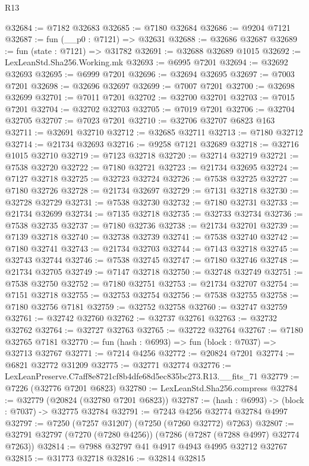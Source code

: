\begin{lexlean}{R13}
\begin{coremodule}
@32684 := @7182 @32683
@32685 := @7180 @32684
@32686 := @9204 @7121
@32687 := fun (__p0 : @7121) => @32631
@32688 := @32686 @32687
@32689 := fun (state : @7121) => @31782
@32691 := @32688 @32689 @1015
@32692 := LexLeanStd.Sha256.Working.mk
@32693 := @6995 @7201
@32694 := @32692 @32693
@32695 := @6999 @7201
@32696 := @32694 @32695
@32697 := @7003 @7201
@32698 := @32696 @32697
@32699 := @7007 @7201
@32700 := @32698 @32699
@32701 := @7011 @7201
@32702 := @32700 @32701
@32703 := @7015 @7201
@32704 := @32702 @32703
@32705 := @7019 @7201
@32706 := @32704 @32705
@32707 := @7023 @7201
@32710 := @32706 @32707 @6823 @163
@32711 := @32691 @32710
@32712 := @32685 @32711
@32713 := @7180 @32712
@32714 := @21734 @32693
@32716 := @9258 @7121 @32689
@32718 := @32716 @1015 @32710
@32719 := @7123 @32718
@32720 := @32714 @32719
@32721 := @7538 @32720
@32722 := @7180 @32721
@32723 := @21734 @32695
@32724 := @7127 @32718
@32725 := @32723 @32724
@32726 := @7538 @32725
@32727 := @7180 @32726
@32728 := @21734 @32697
@32729 := @7131 @32718
@32730 := @32728 @32729
@32731 := @7538 @32730
@32732 := @7180 @32731
@32733 := @21734 @32699
@32734 := @7135 @32718
@32735 := @32733 @32734
@32736 := @7538 @32735
@32737 := @7180 @32736
@32738 := @21734 @32701
@32739 := @7139 @32718
@32740 := @32738 @32739
@32741 := @7538 @32740
@32742 := @7180 @32741
@32743 := @21734 @32703
@32744 := @7143 @32718
@32745 := @32743 @32744
@32746 := @7538 @32745
@32747 := @7180 @32746
@32748 := @21734 @32705
@32749 := @7147 @32718
@32750 := @32748 @32749
@32751 := @7538 @32750
@32752 := @7180 @32751
@32753 := @21734 @32707
@32754 := @7151 @32718
@32755 := @32753 @32754
@32756 := @7538 @32755
@32758 := @7180 @32756 @7181
@32759 := @32752 @32758
@32760 := @32747 @32759
@32761 := @32742 @32760
@32762 := @32737 @32761
@32763 := @32732 @32762
@32764 := @32727 @32763
@32765 := @32722 @32764
@32767 := @7180 @32765 @7181
@32770 := fun (hash : @6993) => fun (block : @7037) => @32713 @32767
@32771 := @7214 @4256
@32772 := @20824 @7201
@32774 := @6821 @32772 @31209
@32775 := @32771 @32774
@32776 := LexLeanPreserve.C7aff8e8721cf8b4dfe68d5ec835bc273.R13.__fits_71
@32779 := @7226 (@32776 @7201 @6823)
@32780 := LexLeanStd.Sha256.compress
@32784 := @32779 (@20824 (@32780 @7201 @6823))
@32787 := (hash : @6993) -> (block : @7037) -> @32775 @32784
@32791 := @7243 @4256 @32774 @32784 @4997
@32797 := @7250 (@7257 @31207) (@7250 (@7260 @32772) @7263)
@32807 := @32791 @32797 (@7270 (@7280 @4256)) (@7286 (@7287 (@7288 @4997) @32774 @7263))
@32814 := @7988 @32797 @41 @4917 @4943 @4995 @32712 @32767
@32815 := @31773 @32718
@32816 := @32814 @32815

\end{coremodule}
\end{lexlean}
